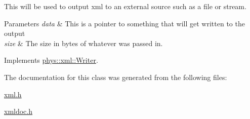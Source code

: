This will be used to output xml to an external source such as a file or stream. 


\begin{DoxyParams}{Parameters}
{\em data} & This is a pointer to something that will get written to the output \\
\hline
{\em size} & The size in bytes of whatever was passed in. \\
\hline
\end{DoxyParams}


Implements \hyperlink{classphys_1_1xml_1_1Writer_ab6d4758ab53743f236eb64d5b2dd7e9e}{phys::xml::Writer}.



The documentation for this class was generated from the following files:\begin{DoxyCompactItemize}
\item 
\hyperlink{xml_8h}{xml.h}\item 
\hyperlink{xmldoc_8h}{xmldoc.h}\end{DoxyCompactItemize}
